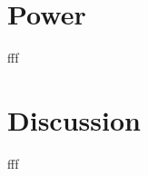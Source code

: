 \documentclass{pnastwo}
\begin{document}
\begin{article}
\section{Power}
fff





\section{Discussion}
% 
fff
















%

\end{article}
\end{document}
